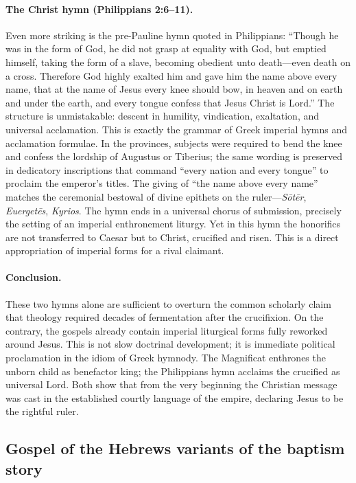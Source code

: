 \paragraph{The Christ hymn (Philippians 2:6--11).}
Even more striking is the pre-Pauline hymn quoted in Philippians:
“Though he was in the form of God, he did not grasp at equality with God,
but emptied himself, taking the form of a slave,
becoming obedient unto death---even death on a cross.
Therefore God highly exalted him
and gave him the name above every name,
that at the name of Jesus every knee should bow,
in heaven and on earth and under the earth,
and every tongue confess that Jesus Christ is Lord.”
The structure is unmistakable: descent in humility, vindication, exaltation, and universal acclamation.
This is exactly the grammar of Greek imperial hymns and acclamation formulae.
In the provinces, subjects were required to bend the knee and confess the lordship of Augustus or Tiberius; the same wording is preserved in dedicatory inscriptions that command “every nation and every tongue” to proclaim the emperor’s titles.
The giving of “the name above every name” matches the ceremonial bestowal of divine epithets on the ruler---\emph{Sōtēr}, \emph{Euergetēs}, \emph{Kyrios}.
The hymn ends in a universal chorus of submission, precisely the setting of an imperial enthronement liturgy.
Yet in this hymn the honorifics are not transferred to Caesar but to Christ, crucified and risen.
This is a direct appropriation of imperial forms for a rival claimant.

\paragraph{Conclusion.}
These two hymns alone are sufficient to overturn the common scholarly claim that theology required decades of fermentation after the crucifixion.
On the contrary, the gospels already contain imperial liturgical forms fully reworked around Jesus.
This is not slow doctrinal development; it is immediate political proclamation in the idiom of Greek hymnody.
The Magnificat enthrones the unborn child as benefactor king; the Philippians hymn acclaims the crucified as universal Lord.
Both show that from the very beginning the Christian message was cast in the established courtly language of the empire, declaring Jesus to be the rightful ruler.


\subsection{Gospel of the Hebrews variants of the baptism story}\label{subsec:gospel-of-the-hebrews-variants-of-the-baptism-story}

